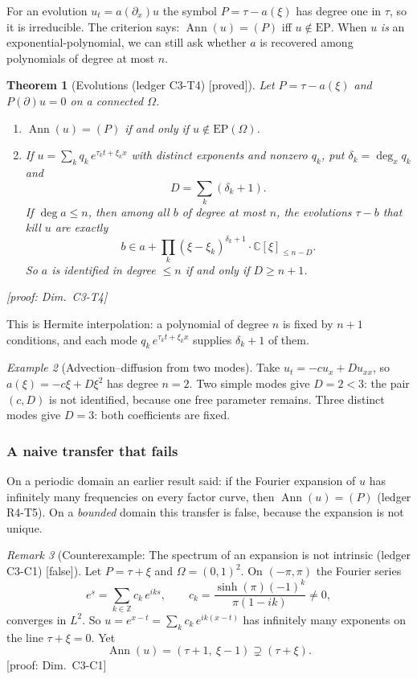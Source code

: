 \documentclass[11pt]{article}
\theoremstyle{plain}
\newtheorem{theorem}{Theorem}[section]
\theoremstyle{definition}
\theoremstyle{remark}
\newtheorem{remark}[theorem]{Remark}
\newtheorem{example}[theorem]{Example}
\newcommand{\C}{\mathbb{C}}
\newcommand{\Z}{\mathbb{Z}}
\DeclareMathOperator{\Ann}{Ann}             %
\newcommand{\EP}{\mathrm{EP}}               %
\newcommand{\badge}[2]{\textcolor{#1}{\textsf{\footnotesize[#2]}}}
\newcommand{\proved}[1][]{\badge{cC}{proved#1}}
\newcommand{\falsest}{\badge{cB}{false}}
\newcommand{\led}[1]{\textcolor{cG}{\textsf{\footnotesize(ledger #1)}}}
\newcommand{\dimref}[1]{\textsf{\footnotesize[proof: Dim.~#1]}}
\newenvironment{falsebox}[2][]{\begin{remark}[Counterexample: #2]}{\end{remark}}
\begin{document}
For an evolution $u_t=a(\partial_x)u$ the symbol $P=\tau-a(\xi)$ has degree one in $\tau$, so it is irreducible. The criterion says: $\Ann(u)=(P)$ iff $u\notin\EP$. When $u$ \emph{is} an exponential-polynomial, we can still ask whether $a$ is recovered among polynomials of degree at most $n$.

\begin{theorem}[{Evolutions \led{C3-T4} \proved}]\label{thm:evol}
Let $P=\tau-a(\xi)$ and $P(\partial)u=0$ on a connected $\Omega$.
\begin{enumerate}[label=(\alph*)]
\item $\Ann(u)=(P)$ if and only if $u\notin\EP(\Omega)$.
\item If $u=\sum_kq_k\,e^{\tau_kt+\xi_kx}$ with distinct exponents and nonzero $q_k$, put $\delta_k=\deg_xq_k$ and
\[
D=\sum_k(\delta_k+1).
\]
If $\deg a\le n$, then among all $b$ of degree at most $n$, the evolutions $\tau-b$ that kill $u$ are exactly
\[
b\in a+\prod_k(\xi-\xi_k)^{\delta_k+1}\cdot\C[\xi]_{\le n-D}.
\]
So $a$ is identified in degree $\le n$ if and only if $D\ge n+1$.
\end{enumerate}
\dimref{C3-T4}
\end{theorem}

This is Hermite interpolation: a polynomial of degree $n$ is fixed by $n+1$ conditions, and each mode $q_k\,e^{\tau_kt+\xi_kx}$ supplies $\delta_k+1$ of them.

\begin{example}[{Advection--diffusion from two modes}]
Take $u_t=-cu_x+Du_{xx}$, so $a(\xi)=-c\xi+D\xi^2$ has degree $n=2$. Two simple modes give $D=2<3$: the pair $(c,D)$ is not identified, because one free parameter remains. Three distinct modes give $D=3$: both coefficients are fixed.
\end{example}

\subsubsection{A naive transfer that fails}

On a periodic domain an earlier result said: if the Fourier expansion of $u$ has infinitely many frequencies on every factor curve, then $\Ann(u)=(P)$ \led{R4-T5}. On a \emph{bounded} domain this transfer is false, because the expansion is not unique.

\begin{falsebox}{The spectrum of an expansion is not intrinsic \led{C3-C1} \falsest}\label{cex:C3C1}
Let $P=\tau+\xi$ and $\Omega=(0,1)^2$. On $(-\pi,\pi)$ the Fourier series
\[
e^{s}=\sum_{k\in\Z}c_k\,e^{iks},\qquad c_k=\frac{\sinh(\pi)(-1)^k}{\pi(1-ik)}\neq0,
\]
converges in $L^2$. So $u=e^{x-t}=\sum_kc_k\,e^{ik(x-t)}$ has infinitely many exponents on the line $\tau+\xi=0$. Yet
\[
\Ann(u)=(\tau+1,\ \xi-1)\supsetneq(\tau+\xi).
\]
\dimref{C3-C1}
\end{falsebox}
\end{document}

